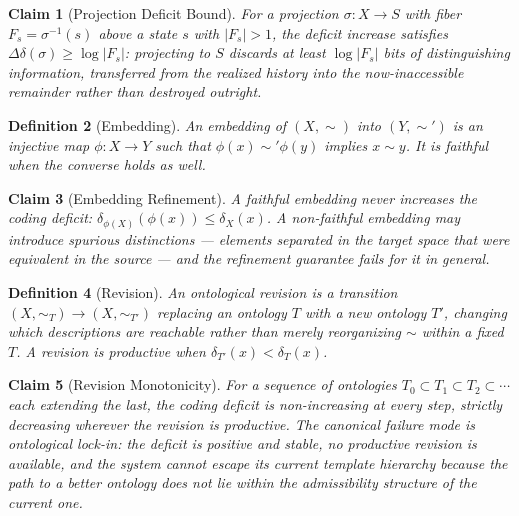 \documentclass[12pt]{report}
\newtheorem{definition}{Definition}[section]
\newtheorem{claim}[definition]{Claim}
\newcommand{\Ddelta}{\ensuremath{\Delta\delta}}
\begin{document}
\begin{claim}[Projection Deficit Bound]
\label{thm:proj-deficit}
For a projection $\sigma : X \to S$ with fiber $F_s = \sigma^{-1}(s)$
above a state $s$ with $|F_s| > 1$, the deficit increase satisfies
$\Ddelta(\sigma) \geq \log|F_s|$: projecting to $S$ discards at least
$\log|F_s|$ bits of distinguishing information, transferred from the
realized history into the now-inaccessible remainder rather than
destroyed outright.
\end{claim}

\begin{definition}[Embedding]
\label{def:embedding}
An \emph{embedding} of $(X,\sim)$ into $(Y,\sim')$ is an injective map
$\phi : X \to Y$ such that $\phi(x) \sim' \phi(y)$ implies $x \sim y$. It
is \emph{faithful} when the converse holds as well.
\end{definition}

\begin{claim}[Embedding Refinement]
\label{thm:embed-refine}
A faithful embedding never increases the coding deficit:
$\delta_{\phi(X)}(\phi(x)) \leq \delta_X(x)$. A non-faithful embedding may
introduce spurious distinctions --- elements separated in the target space
that were equivalent in the source --- and the refinement guarantee fails
for it in general.
\end{claim}

\begin{definition}[Revision]
\label{def:revision}
An \emph{ontological revision} is a transition $(X,\sim_T) \to
(X,\sim_{T'})$ replacing an ontology $T$ with a new ontology $T'$,
changing which descriptions are reachable rather than merely reorganizing
$\sim$ within a fixed $T$. A revision is \emph{productive} when
$\delta_{T'}(x) < \delta_T(x)$.
\end{definition}

\begin{claim}[Revision Monotonicity]
\label{thm:revision-mono}
For a sequence of ontologies $T_0 \subset T_1 \subset T_2 \subset \cdots$
each extending the last, the coding deficit is non-increasing at every
step, strictly decreasing wherever the revision is productive. The
canonical failure mode is \emph{ontological lock-in}: the deficit is
positive and stable, no productive revision is available, and the system
cannot escape its current template hierarchy because the path to a
better ontology does not lie within the admissibility structure of the
current one.
\end{claim}
\end{document}
